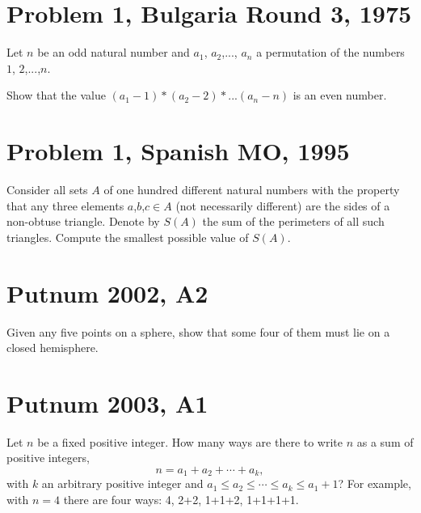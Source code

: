 \documentclass[]{article}
\title{}
\author{}
\begin{document}
\maketitle

\begin{abstract}
\end{abstract}

\section{Problem 1, Bulgaria Round 3, 1975}
Let $n$ be an odd natural number and $a_1$, $a_2$,..., $a_n$ a permutation of the numbers $1$, $2$,...,$n$. 

Show that the value $(a_1-1)*(a_2-2)*...(a_n-n)$ is an even number.

\section{Problem 1, Spanish MO, 1995}
	Consider all sets $A$ of one hundred different natural numbers with the property
	that any three elements $a$,$b$,$c \in A$ (not necessarily different) are the sides of
	a non-obtuse triangle. Denote by $S(A)$ the sum of the perimeters of all such
	triangles. Compute the smallest possible value of $S(A)$.


\section{Putnum 2002, A2}
Given any five points on a sphere, show that some four of them
must lie on a closed hemisphere.

\section{Putnum 2003, A1}
Let $n$ be a fixed positive integer. How many ways are there to write  $n$
as a sum of positive integers,  
\[
n = a_1 + a_2 + \cdots + a_k,
\]
with  $k$  an
arbitrary positive integer and  $a_1 \le a_2 \le \cdots \le a_k \le a_1  + 1$?
For example, with $n=4$ there are four ways: 4, 2+2, 1+1+2, 1+1+1+1.
\end{document}
